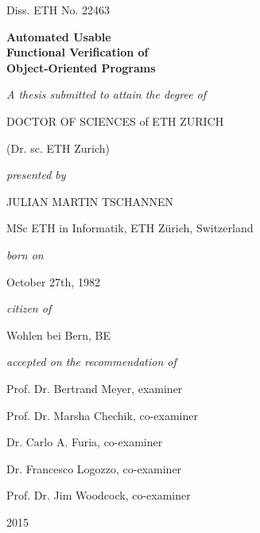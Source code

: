 \mbox{}


\centerline{\sc Diss. ETH No. 22463}

\vskip 1cm

\begin{center}
\huge \textbf{Automated Usable\\ Functional Verification of\\ Object-Oriented Programs}
\end{center}

\vskip 1cm

\centerline{\it A thesis submitted to attain the degree of}

\vskip 0.5cm

\centerline{DOCTOR OF SCIENCES of ETH ZURICH}
\centerline{(Dr. sc. ETH Zurich)}

\vskip 1.0cm

\centerline{\it presented by}
\centerline{JULIAN MARTIN TSCHANNEN}
\centerline{MSc ETH in Informatik, ETH Z\"urich, Switzerland}
\vskip 0.5cm

\centerline{\it born on}
\centerline{October 27th, 1982}

\vskip 0.5cm

\centerline{\it citizen of}
\centerline{Wohlen bei Bern, BE}

\vskip 1.0cm

\centerline{\it accepted on the recommendation of}
\vskip 0.5cm
\centerline{Prof. Dr. Bertrand Meyer, examiner}
\centerline{Prof. Dr. Marsha Chechik, co-examiner}
\centerline{Dr. Carlo A. Furia, co-examiner}
\centerline{Dr. Francesco Logozzo, co-examiner}
\centerline{Prof. Dr. Jim Woodcock, co-examiner}

\vskip 1.0cm

\centerline{2015}
